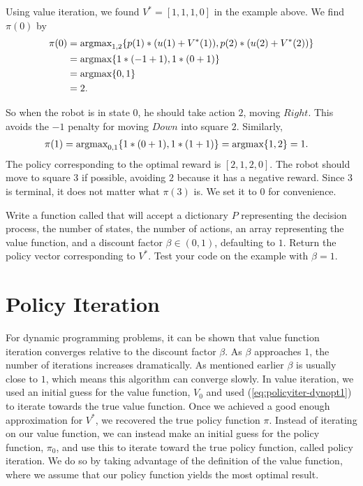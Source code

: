 Using value iteration, we found $V^*  = [1, 1, 1, 0]$ in the example above.
We find $\pi(0)$ by
\begin{align*}
\pi(0) &=\mbox{argmax}_{1,2} \{p(1)*(u(1) + V^*(1)), p(2)*(u(2)+V^*(2))\} \\
&= \mbox{argmax} \{1*(-1+1), 1*(0+1)\} \\
&= \mbox{argmax}\{0, 1\}\\
&= 2.
\end{align*}

So when the robot is in state $0$, he should take action $2$, moving $Right$.
This avoids the $-1$ penalty for moving $Down$ into square $2$.
Similarly,
\begin{align*}
\pi(1) &= \mbox{argmax}_{0,1} \{1*(0+1), 1*(1+1)\} = \mbox{argmax} \{1, 2\} = 1.
\end{align*}
The policy corresponding to the optimal reward is $[2,1,2,0]$.
The robot should move to square $3$ if possible, avoiding $2$ because it has a negative reward.
Since $3$ is terminal, it does not matter what $\pi(3)$ is.
We set it to $0$ for convenience.


\begin{problem}
\label{prob:policyiter-value2}
Write a function called  that will accept a dictionary $P$ representing the decision process, the number of states, the number of actions, an array representing the value function, and a discount factor $\beta \in (0,1)$, defaulting to $1$.
Return the policy vector corresponding to $V^*$.
Test your code on the example with $\beta = 1$.
\end{problem}

\section*{Policy Iteration}
For dynamic programming problems, it can be shown that value function iteration converges relative to the discount factor $\beta$.
As $\beta$ approaches $1$, the number of iterations increases dramatically.
As mentioned earlier $\beta$ is usually close to $1$, which means this algorithm can converge slowly.
In value iteration, we used an initial guess for the value function, $V_0$ and used (\ref{eq:policyiter-dynopt1}) to iterate towards the true value function.
Once we achieved a good enough approximation for $V^*$, we recovered the true policy function $\pi$.
Instead of iterating on our value function, we can instead make an initial guess for the policy function, $\pi_0$, and use this to iterate toward the true policy function, called policy iteration.
We do so by taking advantage of the definition of the value function, where we assume that our policy function yields the most optimal result.


